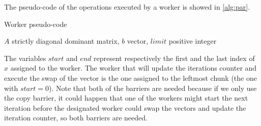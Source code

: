 \documentclass[12pt]{article}
\begin{document}
	The pseudo-code of the operations executed by a worker is showed in \ref{alg:par}.
	\begin{algorithm}[H]
		\caption{Worker pseudo-code}\label{alg:par}
		\begin{algorithmic}[1]
			\Require $A$ strictly diagonal dominant matrix, $b$ vector, $limit$ positive integer
			\EndIf
			\EndFor
			\EndFor
			\EndIf
			\EndWhile
		\end{algorithmic}
	\end{algorithm}
	\noindent The variables $start$ and $end$ represent respectively the first and the last index of $x$ assigned to the worker. The worker that will update the iterations counter and execute the swap of the vector is the one assigned to the leftmost chunk (the one with $start = 0$). Note that both of the barriers are needed because if we only use the copy barrier, it could happen that one of the workers might start the next iteration before the designated worker could swap the vectors and update the iteration counter, so both barriers are needed. 
	
	
\end{document}
